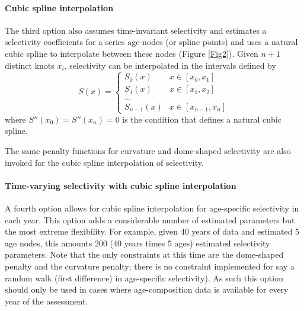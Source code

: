 \paragraph{Cubic spline interpolation}
The third option also assumes time-invariant selectivity and estimates a selectivity coefficients for a series age-nodes (or spline points) and uses a natural cubic spline to interpolate between these nodes (Figure \ref{Fig2}). Given $n+1$ distinct knots $x_i$, selectivity can be interpolated in the intervals defined by
\[
S(x) = \begin{cases}
    S_0(x) & x \in [x_0,x_1]\\
    S_1(x) & x \in [x_1,x_2]\\
    ...\\
    S_{n-1}(x) & x \in [x_{n-1},x_n]
\end{cases}
\]
where  $S''(x_0) = S''(x_n)=0$  is the condition that defines a natural cubic spline.

The same penalty functions for curvature and dome-shaped selectivity are also invoked for the cubic spline interpolation of selectivity.

\paragraph{Time-varying selectivity with cubic spline interpolation} A fourth option allows for cubic spline interpolation for age-specific selectivity  in each year.  This option adds a considerable number of estimated parameters but the most extreme flexibility.  For example, given 40 years of data and estimated 5 age nodes, this amounts 200 (40 years times 5 ages) estimated selectivity parameters.  Note that the only constraints at this time are the dome-shaped penalty and the curvature penalty; there is no constraint implemented for say a random walk (first difference) in age-specific selectivity).  As such this option should only be used in cases where age-composition data is available for every year of the assessment.

